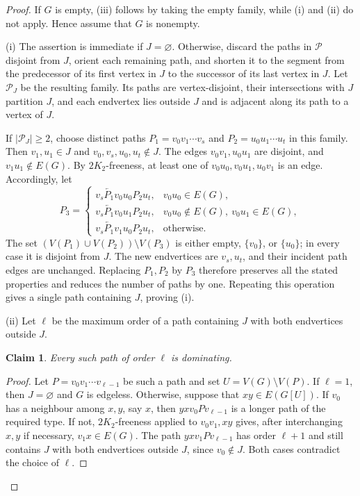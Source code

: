 \documentclass[11pt]{article}
\numberwithin{equation}{section}
\theoremstyle{plain}
\theoremstyle{definition}
\theoremstyle{plain}
\newtheorem{claim}{Claim}[section]
\begin{document}
\begin{proof}
If $G$ is empty, (iii) follows by taking the empty family, while
(i) and (ii) do not apply. Hence assume that $G$ is nonempty.

\noindent
(i) The assertion is immediate if $J=\varnothing$.
Otherwise, discard the paths in $\mathcal P$ disjoint from $J$,
orient each remaining path, and shorten it to the segment from the
predecessor of its first vertex in $J$ to the successor of its last
vertex in $J$. Let $\mathcal P_J$ be the resulting family.
Its paths are vertex-disjoint, their intersections with $J$
partition $J$, and each endvertex lies outside $J$ and is
adjacent along its path to a vertex of $J$.

If $|\mathcal P_J|\geq2$, choose distinct paths
$P_1=v_0v_1\cdots v_s$ and $P_2=u_0u_1\cdots u_t$ in this
family. Then $v_1,u_1\in J$ and $v_0,v_s,u_0,u_t\notin J$.
The edges $v_0v_1,u_0u_1$ are disjoint, and $v_1u_1\notin E(G)$.
By $2K_2$-freeness, at least one of $v_0u_0,v_0u_1,u_0v_1$
is an edge. Accordingly, let
\[
P_3=
\begin{cases}
 v_s\overleftarrow {P_1}v_0u_0P_2u_t,
   &v_0u_0\in E(G),\\
 v_s\overleftarrow {P_1}v_0u_1P_2u_t,
   &v_0u_0\notin E(G),\ v_0u_1\in E(G),\\
 v_s\overleftarrow {P_1}v_1u_0P_2u_t,
   &\text{otherwise}.
\end{cases}
\]
The set $(V(P_1)\cup V(P_2))\setminus V(P_3)$ is either empty,
$\{v_0\}$, or $\{u_0\}$; in every case it is disjoint from $J$. The new endvertices are $v_s,u_t$,
and their incident path edges are unchanged. Replacing $P_1,P_2$
by $P_3$ therefore preserves all the stated properties and reduces
the number of paths by one. Repeating this operation gives a single
path containing $J$, proving (i).

\medskip
\noindent
(ii) Let $\ell$ be the maximum order of a path containing $J$
with both endvertices outside $J$.

\begin{claim}\label{claim:U-independent}
Every such path of order $\ell$ is dominating.
\end{claim}

\begin{proof}
Let $P=v_0v_1\cdots v_{\ell-1}$ be such a path and   set
$U=V(G)\setminus V(P)$. If $\ell=1$, then $J=\varnothing$
and $G$ is edgeless. Otherwise, suppose that $xy\in E(G[U])$.
If $v_0$ has a neighbour among $x,y$, say $x$, then
$yxv_0P v_{\ell-1}$ is a longer path of the required type.
If not, $2K_2$-freeness applied to $v_0v_1,xy$ gives, after
interchanging $x,y$ if necessary, $v_1x\in E(G)$. The path
$yxv_1P v_{\ell-1}$ has order $\ell+1$ and still contains $J$
with both endvertices outside $J$, since $v_0\notin J$.
Both cases contradict the choice of $\ell$.
\end{proof}


\end{proof}
\end{document}
